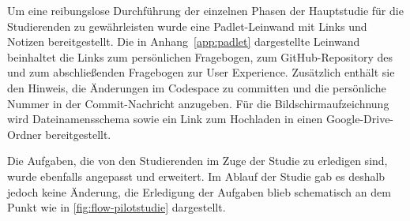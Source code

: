 Um eine reibungslose Durchführung der einzelnen Phasen der Hauptstudie für die Studierenden zu gewährleisten wurde eine Padlet-Leinwand mit Links und Notizen bereitgestellt. Die in Anhang~\ref{app:padlet} dargestellte Leinwand beinhaltet die Links zum persönlichen Fragebogen, zum GitHub-Repository des \gs und zum abschließenden Fragebogen zur User Experience. Zusätzlich enthält sie den Hinweis, die Änderungen im Codespace zu committen und die persönliche Nummer in der Commit-Nachricht anzugeben. Für die Bildschirmaufzeichnung wird Dateinamensschema sowie ein Link zum Hochladen in einen Google-Drive-Ordner bereitgestellt.

Die Aufgaben, die von den Studierenden im Zuge der Studie zu erledigen sind, wurde ebenfalls angepasst und erweitert. Im Ablauf der Studie gab es deshalb jedoch keine Änderung, die Erledigung der Aufgaben blieb schematisch an dem Punkt wie in \ref{fig:flow-pilotstudie} dargestellt.
